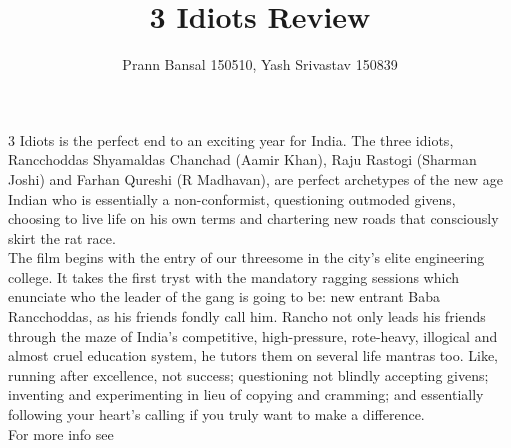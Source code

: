 \documentclass{article}
\title{3 Idiots Review}
\author{Prann Bansal 150510, Yash Srivastav 150839}
\begin{document}
\maketitle

3 Idiots is the perfect end to an exciting year for India. The three idiots, Rancchoddas Shyamaldas Chanchad (Aamir Khan), Raju Rastogi (Sharman Joshi) and Farhan Qureshi (R Madhavan), are perfect archetypes of the new age Indian who is essentially a non-conformist, questioning outmoded givens, choosing to live life on his own terms and chartering new roads that consciously skirt the rat race.\\
 The film begins with the entry of our threesome in the city's elite engineering college. It takes the first tryst with the mandatory ragging sessions which enunciate who the leader of the gang is going to be: new entrant Baba Rancchoddas, as his friends fondly call him. Rancho not only leads his friends through the maze of India's competitive, high-pressure, rote-heavy, illogical and almost cruel education system, he tutors them on several life mantras too. Like, running after excellence, not success; questioning not blindly accepting givens; inventing and experimenting in lieu of copying and cramming; and essentially following your heart's calling if you truly want to make a difference.\\

For more info see \cite{indiatimes-article}


\end{document}
